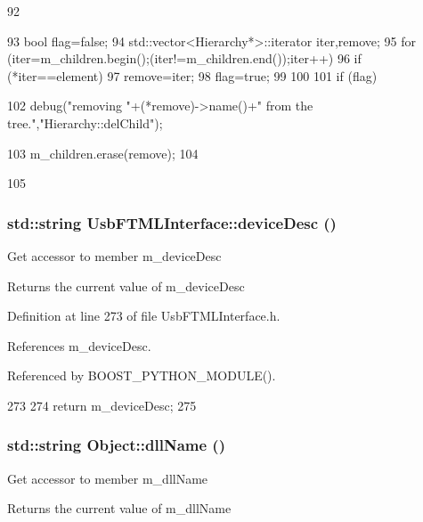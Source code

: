 \begin{DoxyCode}
92                                           {
93   bool flag=false;
94   std::vector<Hierarchy*>::iterator iter,remove;
95   for (iter=m_children.begin();(iter!=m_children.end());iter++){
96     if (*iter==element){
97       remove=iter;
98       flag=true;
99     }
100   }
101   if (flag){
102     debug("removing "+(*remove)->name()+" from the tree.","Hierarchy::delChild");
      
103     m_children.erase(remove);
104   }
105 }
\end{DoxyCode}
\hypertarget{classUsbFTMLInterface_ab541b4c57c1e7e947037acbfebc3fe3b}{
\subsubsection[{deviceDesc}]{\setlength{\rightskip}{0pt plus 5cm}std::string UsbFTMLInterface::deviceDesc ()}}
\label{classUsbFTMLInterface_ab541b4c57c1e7e947037acbfebc3fe3b}
Get accessor to member m\_\-deviceDesc \begin{DoxyReturn}{Returns}
the current value of m\_\-deviceDesc 
\end{DoxyReturn}


Definition at line 273 of file UsbFTMLInterface.h.

References m\_\-deviceDesc.

Referenced by BOOST\_\-PYTHON\_\-MODULE().


\begin{DoxyCode}
273                           {
274     return m_deviceDesc;
275   }
\end{DoxyCode}
\hypertarget{classObject_a2e3947f2870094c332d7454117f3ec63}{
\subsubsection[{dllName}]{\setlength{\rightskip}{0pt plus 5cm}std::string Object::dllName ()}}
\label{classObject_a2e3947f2870094c332d7454117f3ec63}
Get accessor to member m\_\-dllName \begin{DoxyReturn}{Returns}
the current value of m\_\-dllName 
\end{DoxyReturn}


